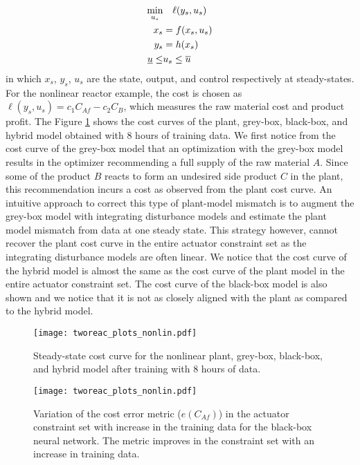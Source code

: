 \documentclass{article}
\begin{document}
\begin{align*}
  \underset{u_s}{\textnormal{min}} & \quad \ell(y_s, u_s) \\
  x_s &= f(x_s, u_s)\\ 
  y_s &= h(x_s) \\
  \underline{u} \leq &u_s \leq \overline{u}
\end{align*}
in which $x_s$, $y_s$, $u_s$ are the state, output, and control respectively at
steady-states. For the nonlinear reactor example, the cost is chosen as
$\ell(y_s, u_s) = c_1C_{Af} - c_2C_B$, which measures the raw material cost and
product profit. The Figure \ref{fig:cost_curves} shows the cost curves of the
plant, grey-box, black-box, and hybrid model obtained with 8 hours of training
data. We first notice from the cost curve of the grey-box model that an
optimization with the grey-box model results in the optimizer recommending a
full supply of the raw material $A$. Since some of the product $B$ reacts to
form an undesired side product $C$ in the plant, this recommendation incurs a
cost as observed from the plant cost curve. An intuitive approach to correct
this type of plant-model mismatch is to augment the grey-box model with
integrating disturbance models and estimate the plant model mismatch from data
at one steady state. This strategy however, cannot recover the plant cost curve
in the entire actuator constraint set as the integrating disturbance models are
often linear. We notice that the cost curve of the hybrid model is almost the
same as the cost curve of the plant model in the entire actuator constraint set.
The cost curve of the black-box model is also shown and we notice that it is not
as closely aligned with the plant as compared to the hybrid model.

\begin{figure}[!h]
  \centering
  \texttt{[image: tworeac\_plots\_nonlin.pdf]}
  \caption{Steady-state cost curve for the nonlinear plant, grey-box, black-box,
  and hybrid model after training with 8 hours of data.}
  \label{fig:cost_curves}
\end{figure}

\begin{figure}[!h]
  \centering
  \texttt{[image: tworeac\_plots\_nonlin.pdf]}
  \caption{Variation of the cost error metric ($e(C_{Af})$) in the actuator
           constraint set with increase in the training data for the 
           black-box neural network. The metric improves in the 
           constraint set with an increase in training data.}
  \label{fig:cost_error_bb}
\end{figure}
\end{document}

